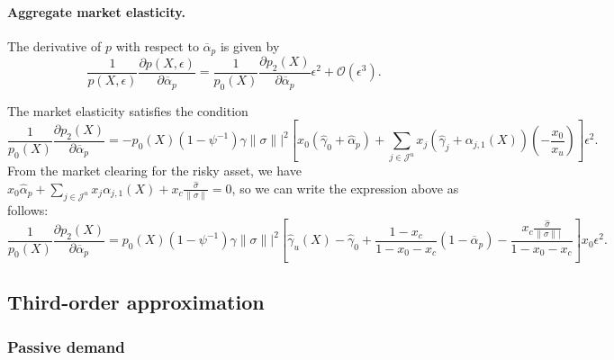 \paragraph{Aggregate market elasticity.} The derivative of $p$ with respect to $\overline{\alpha}_p$ is given by
\begin{equation}
    \frac{1}{p(X,\epsilon)}\frac{\partial p(X,\epsilon)}{\partial \overline{\alpha}_p} = \frac{1}{p_0(X)} \frac{\partial p_2(X)}{\partial \overline{\alpha}_p} \epsilon^2 + \mathcal{O}(\epsilon^3).
\end{equation}

The market elasticity satisfies the condition
\begin{equation}
    \frac{1}{p_0(X)} \frac{\partial p_2(X)}{\partial \overline{\alpha}_p} = - p_0(X)  (1-\psi^{-1}) \gamma \|\sigma\||^ 2 \left[ x_0(\hat{\gamma}_0 + \hat{\alpha}_{p}) + \sum_{j\in\mathcal{J}^u} x_j \left( \hat{\gamma}_j + \alpha_{j,1}(X) \right)  \left(- \frac{x_0}{x_u} \right) \right] \epsilon^2.
\end{equation}
From the market clearing for the risky asset, we have $x_0 \hat{\alpha}_p + \sum_{j \in \mathcal{J}^u} x_j \alpha_{j,1}(X) + x_c \frac{\hat{\sigma}}{\|\sigma\|} = 0$, so we can write the expression above as follows:
\begin{equation}
    \frac{1}{p_0(X)} \frac{\partial p_2(X)}{\partial \overline{\alpha}_p} = p_0(X)  (1-\psi^{-1}) \gamma \|\sigma\||^ 2 \left[ \hat{\gamma}_u(X) - \hat{\gamma}_0 + \frac{1-x_c}{1-x_0 -x_c}  (1-\overline{\alpha}_p) -  \frac{ x_c \frac{\hat{\sigma}}{\|\sigma\||}}{1-x_0 - x_c}  \right] x_0 \epsilon^2.
\end{equation}


\subsection{Third-order approximation}

\subsubsection{Passive demand}

